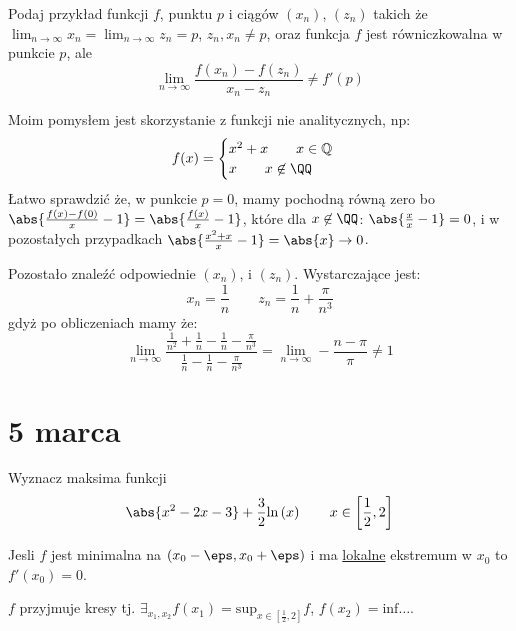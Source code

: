 \documentclass[11pt]{scrartcl}
\begin{document}
  \begin{zadanie}
      Podaj przykład funkcji $f$, punktu $p$ i ciągów $\left ( x_n \right )$, $\left ( z_n \right )$ takich że $\lim_{n \to \infty } x_n  = \lim_{n \to \infty } z_n = p$, $z_n, x_n \not = p$, oraz funkcja $f$ jest równiczkowalna w punkcie $p$, ale
      \[
          \lim_{n \to \infty } \frac{f \left ( x_n \right ) - f \left ( z_n \right )}{x_n - z_n} \not = f'(p)
      \]
  \end{zadanie}
  
  Moim pomysłem jest skorzystanie z funkcji nie analitycznych, np:
  \[
      f(x) = 
      \begin{cases}
        x^2 + x \qquad x \in \mathbb{Q} \\
        x   \qquad x \not \in \QQ 
      \end{cases}
  \]
  Łatwo sprawdzić że, w punkcie $p = 0$, mamy pochodną równą zero bo $\abs{\frac{f(x) - f(0)}{x} -1}  = \abs{\frac{f(x)}{x} -1} $, które dla $x \not \in \QQ$: $\abs{\frac{x}{x} - 1} = 0$, i w pozostałych przypadkach $\abs{\frac{x^2 + x}{x} - 1} = \abs{x} \to 0$.

  Pozostało znaleźć odpowiednie $(x_n)$, i $(z_n)$. Wystarczające jest:
  \[
    x_n = \frac{1}{n} \qquad z_n = \frac{1}{n} + \frac{\pi}{n^3} 
  \]
  gdyż po obliczeniach mamy że:
  \[
    \lim_{n \to \infty } \frac{\frac{1}{n^2} + \frac{1}{n} - \frac{1}{n} - \frac{\pi }{n^3}}{\frac{1}{n} - \frac{1}{n} - \frac{\pi }{n^3}} =  \lim_{n \to \infty }  - \frac{n - \pi }{\pi } \not = 1   
  \]

  \section{5 marca}

  \begin{przykład}
      Wyznacz maksima funkcji
      \[
          \abs{x^2 - 2x - 3} + \frac{3}{2} \text{ln} \left ( x \right ) \qquad x \in \left [ \frac{1}{2}, 2 \right ]
      \]
  \end{przykład}
  
  \begin{lemat}
    Jesli $f$ jest minimalna na $\left ( x_{0} - \eps, x_{0} + \eps \right )$ i ma \ul{lokalne} ekstremum w $x_{0}$ to $f'(x_{0}) = 0$.
  \end{lemat}
  
  $f$ przyjmuje kresy tj. $\exists_{x_{1}, x_{2}} f(x_{1}) = \text{sup}_{x \in \left [ \frac{1}{2}, 2 \right ]} f $, $f(x_2) = \text{inf} \dots $.
\end{document}
